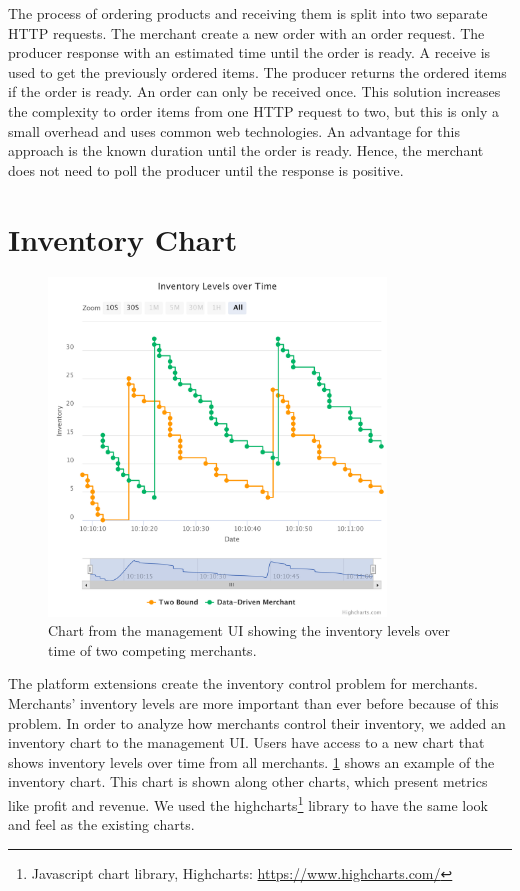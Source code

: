 The process of ordering products and receiving them is split into two separate HTTP requests.
The merchant create a new order with an order request.
The producer response with an estimated time until the order is ready.
A receive is used to get the previously ordered items.
The producer returns the ordered items if the order is ready.
An order can only be received once.
This solution increases the complexity to order items from one HTTP request to two, but this is only a small overhead and uses common web technologies.
An advantage for this approach is the known duration until the order is ready.
Hence, the merchant does not need to poll the producer until the response is positive.

\section{Inventory Chart}
\label{section:inventory_graph}

\begin{figure}[t]
	\centering
	\includegraphics[width=0.8\textwidth]{figures/inventory_graph}
	\caption{Chart from the management UI showing the inventory levels over time of two competing merchants.}
	\label{fig:invnetory_graph}
\end{figure}

The platform extensions create the inventory control problem for merchants.
Merchants' inventory levels are more important than ever before because of this problem.
In order to analyze how merchants control their inventory, we added an inventory chart to the management UI.
Users have access to a new chart that shows inventory levels over time from all merchants.
\cref{fig:invnetory_graph} shows an example of the inventory chart.
This chart is shown along other charts, which present metrics like profit and revenue. 
We used the highcharts\footnote{Javascript chart library, Highcharts: \url{https://www.highcharts.com/}} library to have the same look and feel as the existing charts.

